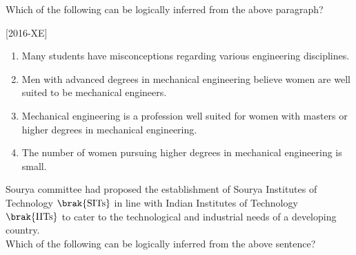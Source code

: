 Which of the following can be logically inferred from the above paragraph? 

    \hfill{[2016-XE]}
\begin{enumerate}
    \item Many students have misconceptions regarding various engineering disciplines.\\
    \item Men with advanced degrees in mechanical engineering believe women are well suited to be mechanical engineers.\\
    \item Mechanical engineering is a profession well suited for women with masters or higher degrees in mechanical engineering.\\
    \item The number of women pursuing higher degrees in mechanical engineering is small.
\end{enumerate}
\item Sourya committee had proposed the establishment of Sourya Institutes of Technology $\brak{\text{SITs}}$ in line with Indian Institutes of Technology $\brak{\text{IITs}}$ to cater to the technological and industrial needs of a developing country.\\

Which of the following can be logically inferred from the above sentence?\\

